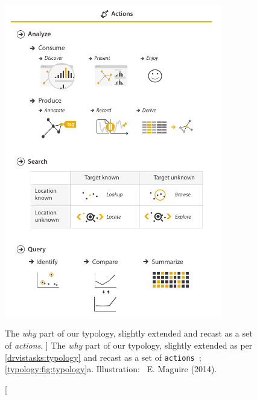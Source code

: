 
\begin{figure}
	\centering
    \includegraphics[width=0.85\textwidth]{figures/fig3-2.pdf}
    \caption
    [
        The \textsl{why} part of our typology, slightly extended and recast as a set of \textsl{actions}.
    ]
    {
        The \textsl{why} part of our typology, slightly extended as per \autoref{drvistasks:typology} and recast as a set of {\tt actions}~\cite{Munzner2014}; \cf \autoref{typology:fig:typology}a. Illustration: \ccLogo~E. Maguire (2014).
    }
	\centering
	\label{fig:typology-actions}
\end{figure}



